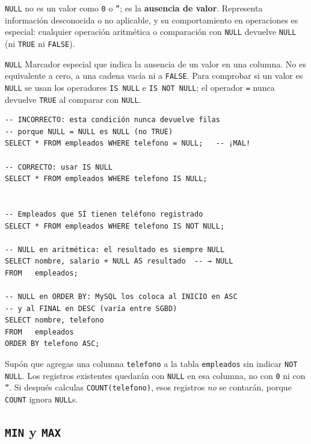 \texttt{NULL} no es un valor como \texttt{0} o \texttt{''};
es la \textbf{ausencia de valor}.
Representa información desconocida o no aplicable, y su
comportamiento en operaciones es especial:
cualquier operación aritmética o comparación con \texttt{NULL}
devuelve \texttt{NULL} (ni \texttt{TRUE} ni \texttt{FALSE}).

\begin{definicion}{\texttt{NULL}}
Marcador especial que indica la ausencia de un valor en una columna.
No es equivalente a cero, a una cadena vacía ni a \texttt{FALSE}.
Para comprobar si un valor es \texttt{NULL} se usan los operadores
\texttt{IS NULL} e \texttt{IS NOT NULL}; el operador \texttt{=}
nunca devuelve \texttt{TRUE} al comparar con \texttt{NULL}.
\end{definicion}

\begin{lstlisting}[caption={Comportamiento de NULL y cómo detectarlo.}]
-- INCORRECTO: esta condición nunca devuelve filas
-- porque NULL = NULL es NULL (no TRUE)
SELECT * FROM empleados WHERE telefono = NULL;   -- ¡MAL!

-- CORRECTO: usar IS NULL
SELECT * FROM empleados WHERE telefono IS NULL;


-- Empleados que SÍ tienen teléfono registrado
SELECT * FROM empleados WHERE telefono IS NOT NULL;

-- NULL en aritmética: el resultado es siempre NULL
SELECT nombre, salario + NULL AS resultado  -- → NULL
FROM   empleados;

-- NULL en ORDER BY: MySQL los coloca al INICIO en ASC
-- y al FINAL en DESC (varía entre SGBD)
SELECT nombre, telefono
FROM   empleados
ORDER BY telefono ASC;
\end{lstlisting}

\begin{ejemplo}
Supón que agregas una columna \texttt{telefono} a la tabla
\texttt{empleados} sin indicar \texttt{NOT NULL}.
Los registros existentes quedarán con \texttt{NULL} en esa columna,
no con \texttt{0} ni con \texttt{''}.
Si después calculas \texttt{COUNT(telefono)}, esos registros
\textit{no} se contarán, porque \texttt{COUNT} ignora \texttt{NULL}s.
\end{ejemplo}

\subsection{\texttt{MIN} y \texttt{MAX}}

